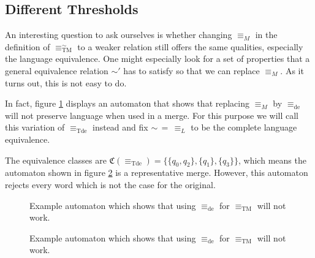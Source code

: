 \subsection{Different Thresholds}

An interesting question to ask ourselves is whether changing $\equiv_M$ in the definition of $\equiv_\text{TM}^\sim$ to a weaker relation still offers the same qualities, especially the language equivalence. One might especially look for a set of properties that a general equivalence relation $\sim'$ has to satisfy so that we can replace $\equiv_M$. As it turns out, this is not easy to do.

In fact, figure \ref{fig:tremoore:desim_counterex1} displays an automaton that shows that replacing $\equiv_M$ by $\equiv_\text{de}$ will not preserve language when used in a merge. For this purpose we will call this variation of $\equiv_\text{Tde}$ instead and fix $\sim \,=\, \equiv_L$ to be the complete language equivalence.

The equivalence classes are $\mathfrak{C}(\equiv_\text{Tde}) = \{ \{q_0, q_2\}, \{q_1\}, \{q_3\} \}$, which means the automaton shown in figure \ref{fig:tremoore:desim_counterex2} is a representative merge. However, this automaton rejects every word which is not the case for the original.

\begin{figure}
\centering
{}
\caption{Example automaton which shows that using $\equiv_\text{de}$ for $\equiv_\text{TM}$ will not work.}
\label{fig:tremoore:desim_counterex1}
\end{figure}

\begin{figure}
\centering
{}
\caption{Example automaton which shows that using $\equiv_\text{de}$ for $\equiv_\text{TM}$ will not work.}
\label{fig:tremoore:desim_counterex2}
\end{figure}








